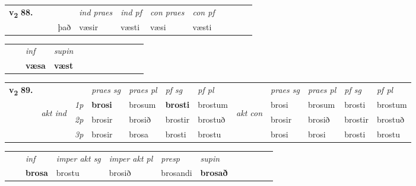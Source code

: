 \begin{tabular}{llllllllllll}\toprule
\multirow{4}{*}{{{\textbf{v{\textsubscript{2}}} \Large{\textbf{88.}}}}}  & &  & &  \textit{ind praes} & \textit{ind pf} & \textit{con praes} & \textit{con pf} \\*
&  & & það & væsir & væsti & væsi & væsti \\*
\cmidrule{5-9}
\end{tabular}


\begin{tabular}{llllllllllll}
 & & \textit{inf}      & \textit{supin}       \\*
  & & \textbf{væsa}       &  \textbf{væst}   \\*
\cmidrule{1-12}
\end{tabular}



\begin{tabular}{llllllllllll} \toprule
\multirow{4}{*}{{{\textbf{v{\textsubscript{2}}} \Large{\textbf{89.}}}}}  & &   &  \textit{praes sg}  & \textit{praes pl}  &\textit{ pf sg} & \textit{pf pl} &  &  \textit{praes sg}  & \textit{praes pl}  & \textit{pf sg} & \textit{pf pl } \\*
	\cmidrule{4-7} \cmidrule{9-12}
 & \multirow{3}{*}{\begin{turn}{90}\textit{akt ind}\end{turn}} & {\textit{1p}} & \textbf{brosi} & brosum    & \textbf{brosti} & brostum & \multirow{3}{*}{\begin{turn}{90}\textit{akt con}\end{turn}} &brosi & brosum & brosti & brostum\\*
& &  {\textit{2p}} &  brosir  & brosið   & brostir & brostuð & & brosir & brosið & brostir & brostuð \\*
& &  {\textit{3p}} & brosir & brosa   & brosti & brostu & & brosi & brosi& brosti & brostu  \\*
\cmidrule{4-7} \cmidrule{9-12}
\end{tabular}


\begin{tabular}{llllllllllll}
 & & \textit{inf} & \textit{imper akt sg} & \textit{imper akt pl}   & \textit{presp} & \textit{supin}       \\*
  & & \textbf{brosa} & brostu  & brosið   & brosandi &  \textbf{brosað}   \\*
\cmidrule{1-12}
\end{tabular}



